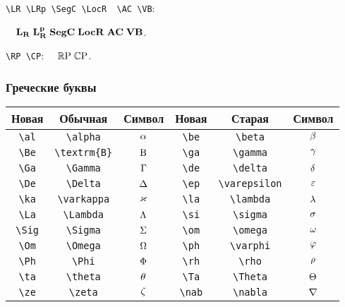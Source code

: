 \documentclass[a4paper]{article}
\begin{document}
\verb$\LR \LRp \SegC \LocR  \AC \VB$:

$\quad\mathbf{L_R}\;\mathbf{L_R^p}\;\mathbf{SegC}\;\mathbf{LocR}\;\mathbf{AC}\;\mathbf{VB}$.

\medskip

\verb$\RP \CP$: $\quad\mathbb{R}\mathrm{P}\;\mathbb{C}\mathrm{P}$.

\subsubsection{Греческие буквы}
\begin{center}
\begin{tabular}{|c|c|c||c|c|c|}
\hline \textbf{Новая} & \textbf{Обычная} & \textbf{Символ} &
\textbf{Новая} & \textbf{Старая} & \textbf{Символ} \\
\hline \verb$\al$ & \verb$\alpha$ & $\alpha$ &      \verb$\be$ & \verb$\beta$ & $\beta$ \\
\hline \verb$\Be$ & \verb$\textrm{B}$ & $\mathrm{B}$ &  \verb$\ga$ & \verb$\gamma$ & $\gamma$ \\
\hline \verb$\Ga$ & \verb$\Gamma$ & $\Gamma$ &      \verb$\de$ & \verb$\delta$ & $\delta$ \\
\hline \verb$\De$ & \verb$\Delta$ & $\Delta$ &      \verb$\ep$ & \verb$\varepsilon$ & $\varepsilon$\\
\hline \verb$\ka$ & \verb$\varkappa$ & $\varkappa$ &   \verb$\la$ & \verb$\lambda$ & $\lambda$ \\
\hline \verb$\La$ & \verb$\Lambda$ & $\Lambda$ &     \verb$\si$ & \verb$\sigma$ & $\sigma$ \\
\hline \verb$\Sig$ & \verb$\Sigma$ & $\Sigma$ &    \verb$\om$ & \verb$\omega$ & $\omega$ \\
\hline \verb$\Om$ & \verb$\Omega$ & $\Omega$  &     \verb$\ph$ & \verb$\varphi$ & $\varphi$ \\
\hline \verb$\Ph$ & \verb$\Phi$ & $\Phi$  & \verb$\rh$ & \verb$\rho$ & $\rho$ \\
\hline \verb$\ta$ & \verb$\theta$ & $\theta$ & \verb$\Ta$ & \verb$\Theta$ & $\Theta$ \\
\hline \verb$\ze$ & \verb$\zeta$ & $\zeta$ & \verb$\nab$ & \verb$\nabla$ & $\nabla$ \\
\hline
\end{tabular}
\end{center}
\end{document}
